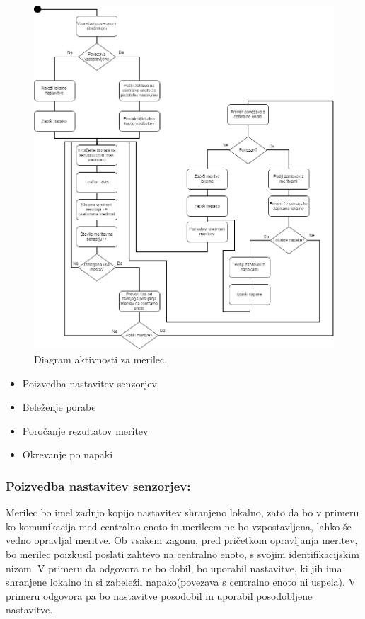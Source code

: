 \documentclass[12pt,a4paper,titlepage,openany]{report}
\begin{document}
\begin{figure}[H]
\begin{center}
\includegraphics[width=1\linewidth]{Slike/ActivityMerilec.png}
\end{center}
\caption{Diagram aktivnosti za merilec.}\label{slika:ActivityMerilec}
\end{figure}

\begin{itemize}
\item Poizvedba nastavitev senzorjev
\item Beleženje porabe
\item Poročanje rezultatov meritev
\item Okrevanje po napaki
\end{itemize}

\subsubsection{Poizvedba nastavitev senzorjev:}
Merilec bo imel zadnjo kopijo nastavitev shranjeno lokalno, zato da bo v primeru ko komunikacija med centralno enoto in merilcem ne bo vzpostavljena, lahko še vedno opravljal meritve. 
Ob vsakem zagonu, pred pričetkom opravljanja meritev, bo merilec poizkusil poslati zahtevo na centralno enoto, s svojim identifikacijskim nizom. V primeru da odgovora ne bo dobil, bo uporabil nastavitve, ki jih ima shranjene lokalno in si zabeležil napako(povezava s centralno enoto ni uspela). V primeru odgovora pa bo nastavitve posodobil in uporabil posodobljene nastavitve. 
\end{document}
